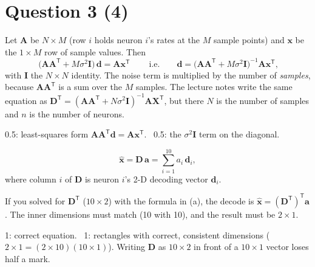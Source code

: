 \documentclass[11pt,letterpaper]{article}
\newcommand{\T}{\mathsf T}
\newcommand{\ans}[1]{\par\vspace{4pt}{\bfseries #1}\quad}
\begin{document}
\section*{Question 3 \hfill (4)}

\ans{(a) [1]}
Let $\mathbf A$ be $N \times M$ (row $i$ holds neuron $i$'s rates at the $M$ sample points) and $\mathbf x$ be the $1 \times M$ row of sample values. Then
\[
\boxed{\ \bigl(\mathbf A\mathbf A^\T + M\sigma^2\mathbf I\bigr)\,\mathbf d = \mathbf A\mathbf x^\T\ }
\qquad\text{i.e.}\qquad \mathbf d = \bigl(\mathbf A\mathbf A^\T + M\sigma^2\mathbf I\bigr)^{-1}\mathbf A\mathbf x^\T,
\]
with $\mathbf I$ the $N \times N$ identity. The noise term is multiplied by the number of \emph{samples}, because $\mathbf A\mathbf A^\T$ is a sum over the $M$ samples. The lecture notes write the same equation as $\mathbf D^\T = (\mathbf A\mathbf A^\T + N\sigma^2\mathbf I)^{-1}\mathbf A\mathbf X^\T$, but there $N$ is the number of samples and $n$ is the number of neurons.
\begin{marking}
0.5: least-squares form $\mathbf A\mathbf A^\T \mathbf d = \mathbf A\mathbf x^\T$. \ 0.5: the $\sigma^2\mathbf I$ term on the diagonal.
\end{marking}

\ans{(b) [2]}
\[
\hat{\mathbf x} = \mathbf D\,\mathbf a = \sum_{i=1}^{10} a_i\,\mathbf d_i,
\]
where column $i$ of $\mathbf D$ is neuron $i$'s 2-D decoding vector $\mathbf d_i$.
\begin{center}
\end{center}
If you solved for $\mathbf D^\T$ ($10 \times 2$) with the formula in (a), the decode is $\hat{\mathbf x} = (\mathbf D^\T)^\T\mathbf a$. The inner dimensions must match (10 with 10), and the result must be $2 \times 1$.
\begin{marking}
1: correct equation. \ 1: rectangles with correct, consistent dimensions ($2 \times 1 = (2 \times 10)(10 \times 1)$). Writing $\mathbf D$ as $10 \times 2$ in front of a $10 \times 1$ vector loses half a mark.
\end{marking}
\end{document}
